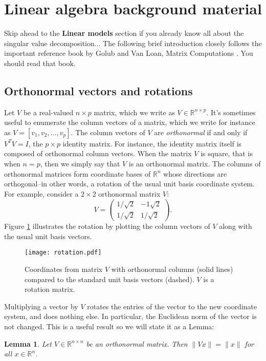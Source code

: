 \documentclass[10pt]{article} %
\newtheorem{lemma}{Lemma}
\newcommand{\R}{{\mathbb R}}
\begin{document}
\section*{Linear algebra background material}

Skip ahead to the {\bf Linear models} section if you already know all about the
singular value decomposition...  The following brief introduction closely
follows the important reference book by Golub and Van Loan, Matrix Computations
\cite{gvl}. You should read that book.

\subsection*{Orthonormal vectors and rotations}

Let $V$ be a real-valued $n\times p$ matrix, which we write as
$V\in\R^{n\times p}$.  It's sometimes useful to enumerate the
column vectors of a matrix, which we write for instance as $V=[v_1, v_2,
\ldots, v_p]$.  The column vectors of $V$ are {\it orthonormal} if and only if
$V^T V = I$, the $p\times p$ identity matrix.  For instance, the identity
matrix itself is composed of orthonormal column vectors.  When the matrix $V$
is square, that is when $n=p$, then we simply say that $V$ is an orthonormal
matrix.
The columns of orthonormal matrices form coordinate bases of $\R^n$
whose directions are orthogonal--in other words, a rotation of
the usual unit basis coordinate system. For example, consider a $2\times 2$
orthonormal matrix $V$:
\[
V = \left(\begin{array}{cc}
1/{\sqrt{2}} & -1{\sqrt{2}} \\
1/{\sqrt{2}} & 1/{\sqrt{2}}
\end{array}\right).
\]
Figure \ref{chxx_rotation} illustrates the rotation by plotting
the column vectors of $V$ along with the usual unit basis vectors.
\begin{figure}
\begin{center}
\texttt{[image: rotation.pdf]}
\end{center}
\caption{Coordinates from matrix $V$ with orthonormal columns (solid lines)
compared to the standard unit basis vectors (dashed). $V$ is a rotation
matrix.}
\label{chxx_rotation}
\end{figure}
Multiplying a vector by $V$ rotates the entries of the vector to the
new coordinate system, and does nothing else. In particular, the Euclidean
norm of the vector is not changed. This is a useful result so we will state
it as a Lemma:
\begin{lemma}\label{invariant}
Let $V\in\R^{n\times n}$ be an orthonormal matrix. Then
$\|Vx\|=\|x\|$ for all $x\in\R^n$.
\end{lemma}
\end{document}
